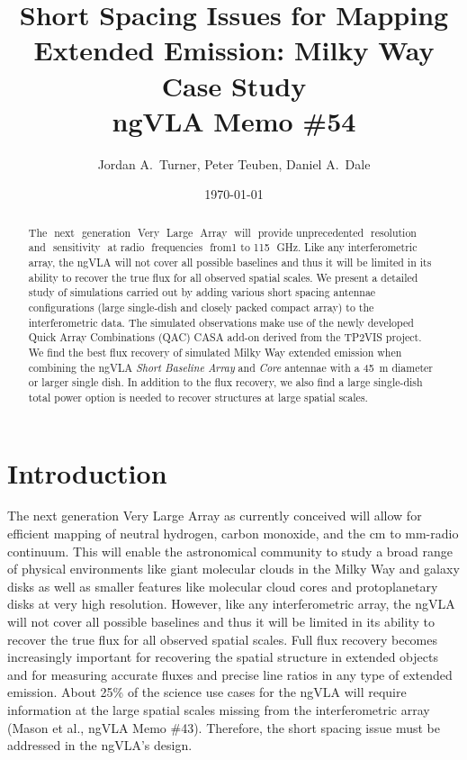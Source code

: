 \documentclass[12pt]{article}
\title{Short Spacing Issues for Mapping Extended Emission: Milky Way Case Study \\ {\Large ngVLA Memo \#54}}
\author{Jordan A.~Turner, Peter Teuben, Daniel A.~Dale}
\date{\today}
\begin{document}
\maketitle

\begin{abstract}
The​ ​ next​ ​ generation​ ​ Very​ ​ Large​ ​ Array​ ​ will​ ​ provide​ ​ unprecedented​ ​ resolution​ ​ and​ ​ sensitivity​ ​ at radio​ ​ frequencies​ ​ from​ ​1 to​ 115​ ​ GHz. Like any interferometric array, the ngVLA will not cover all possible baselines and thus it will be limited in its ability to recover the true flux for all observed spatial scales. We present a detailed study of simulations carried out by adding various short spacing antennae configurations (large single-dish and closely packed compact array) to the interferometric data. The simulated observations make use of the newly developed Quick Array Combinations (QAC) CASA add-on derived from the TP2VIS project. We find the best flux recovery of simulated Milky Way extended emission when combining the ngVLA \textit{Short Baseline Array} and \textit{Core} antennae with a \SI{45}{\meter} diameter or larger single dish. In addition to the flux recovery, we also find a large single-dish total power option is needed to recover structures at large spatial scales. 
\end{abstract}

\section*{Introduction}

The next generation Very Large Array as currently conceived will allow for efficient mapping of neutral hydrogen, carbon monoxide, and the cm to mm-radio continuum. This will enable the astronomical community to study a broad range of physical environments like giant molecular clouds in the Milky Way and galaxy disks as well as smaller features like molecular cloud cores and protoplanetary disks at very high resolution. However, like any interferometric array, the ngVLA will not cover all possible baselines and thus it will be limited in its ability to recover the true flux for all observed spatial scales. Full flux recovery becomes increasingly important for recovering the spatial structure in extended objects and for measuring accurate fluxes and precise line ratios in any type of extended emission. About 25\% of the science use cases for the ngVLA will require information at the large spatial scales missing from the interferometric array (Mason et al., ngVLA Memo \#43). Therefore, the short spacing issue must be addressed in the ngVLA's design.
\end{document}
